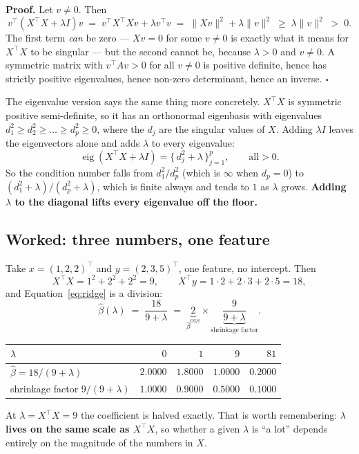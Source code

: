 \documentclass[11pt]{article}
\newcommand{\bhat}{\hat\beta}
\newcommand{\XtX}{X^{\!\top}\!X}
\newcommand{\Xty}{X^{\!\top}y}
\begin{document}
\textbf{Proof.} Let $v \ne 0$. Then
\begin{equation}
  v^{\!\top}(\XtX + \lambda I)v
  \;=\; v^{\!\top}\XtX v + \lambda v^{\!\top}v
  \;=\; \|Xv\|^2 + \lambda\|v\|^2 \;\ge\; \lambda\|v\|^2 \;>\; 0 .
  \label{eq:pd}
\end{equation}
The first term \emph{can} be zero --- $Xv = 0$ for some $v \ne 0$ is exactly
what it means for $\XtX$ to be singular --- but the second cannot be, because
$\lambda > 0$ and $v \ne 0$. A symmetric matrix with $v^{\!\top}Av > 0$ for
all $v \ne 0$ is positive definite, hence has strictly positive eigenvalues,
hence non-zero determinant, hence an inverse. $\square$

The eigenvalue version says the same thing more concretely. $\XtX$ is
symmetric positive semi-definite, so it has an orthonormal eigenbasis with
eigenvalues $d_1^2 \ge d_2^2 \ge \dots \ge d_p^2 \ge 0$, where the $d_j$ are
the singular values of $X$. Adding $\lambda I$ leaves the eigenvectors alone
and adds $\lambda$ to every eigenvalue:
\[
  \operatorname{eig}(\XtX + \lambda I) = \{\,d_j^2 + \lambda\,\}_{j=1}^{p},
  \qquad \text{all} > 0 .
\]
So the condition number falls from $d_1^2/d_p^2$ (which is $\infty$ when
$d_p = 0$) to $(d_1^2+\lambda)/(d_p^2+\lambda)$, which is finite always and
tends to $1$ as $\lambda$ grows. \textbf{Adding $\lambda$ to the diagonal
lifts every eigenvalue off the floor.}

\subsection{Worked: three numbers, one feature}
\label{sec:hand1}

\begin{worked}
Take $x = (1, 2, 2)^{\!\top}$ and $y = (2, 3, 5)^{\!\top}$, one feature, no
intercept. Then
\[
  \XtX = 1^2 + 2^2 + 2^2 = 9,
  \qquad
  \Xty = 1\cdot2 + 2\cdot3 + 2\cdot5 = 18 ,
\]
and Equation~\eqref{eq:ridge} is a division:
\[
  \bhat(\lambda) \;=\; \frac{18}{9 + \lambda}
  \;=\; \underbrace{2}_{\bhat^{\mathrm{OLS}}}
    \times \underbrace{\frac{9}{9+\lambda}}_{\text{shrinkage factor}} .
\]
\begin{center}
\begin{tabular}{@{}lrrrr@{}}
\toprule
$\lambda$ & $0$ & $1$ & $9$ & $81$\\
\midrule
$\bhat = 18/(9+\lambda)$ & $2.0000$ & $1.8000$ & $1.0000$ & $0.2000$\\
shrinkage factor $9/(9+\lambda)$ & $1.0000$ & $0.9000$ & $\mathbf{0.5000}$
  & $0.1000$\\
\bottomrule
\end{tabular}
\end{center}
At $\lambda = \XtX = 9$ the coefficient is halved exactly. That is worth
remembering: \textbf{$\lambda$ lives on the same scale as $\XtX$}, so whether
a given $\lambda$ is ``a lot'' depends entirely on the magnitude of the
numbers in $X$.
\end{worked}
\end{document}
